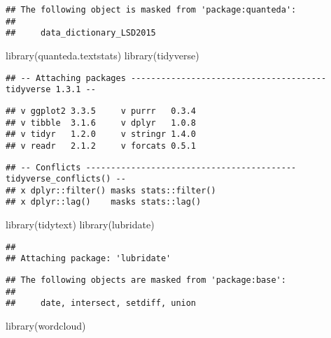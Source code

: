 \documentclass[
]{article}
\newenvironment{Shaded}{\begin{snugshade}}{\end{snugshade}}
\newcommand{\FunctionTok}[1]{\textcolor[rgb]{0.00,0.00,0.00}{#1}}
\newcommand{\NormalTok}[1]{#1}
\begin{document}
\begin{verbatim}
## The following object is masked from 'package:quanteda':
## 
##     data_dictionary_LSD2015
\end{verbatim}

\begin{Shaded}
\begin{Highlighting}[]
\FunctionTok{library}\NormalTok{(quanteda.textstats)}
\FunctionTok{library}\NormalTok{(tidyverse)}
\end{Highlighting}
\end{Shaded}

\begin{verbatim}
## -- Attaching packages --------------------------------------- tidyverse 1.3.1 --
\end{verbatim}

\begin{verbatim}
## v ggplot2 3.3.5     v purrr   0.3.4
## v tibble  3.1.6     v dplyr   1.0.8
## v tidyr   1.2.0     v stringr 1.4.0
## v readr   2.1.2     v forcats 0.5.1
\end{verbatim}

\begin{verbatim}
## -- Conflicts ------------------------------------------ tidyverse_conflicts() --
## x dplyr::filter() masks stats::filter()
## x dplyr::lag()    masks stats::lag()
\end{verbatim}

\begin{Shaded}
\begin{Highlighting}[]
\FunctionTok{library}\NormalTok{(tidytext)}
\FunctionTok{library}\NormalTok{(lubridate)}
\end{Highlighting}
\end{Shaded}

\begin{verbatim}
## 
## Attaching package: 'lubridate'
\end{verbatim}

\begin{verbatim}
## The following objects are masked from 'package:base':
## 
##     date, intersect, setdiff, union
\end{verbatim}

\begin{Shaded}
\begin{Highlighting}[]
\FunctionTok{library}\NormalTok{(wordcloud)}
\end{Highlighting}
\end{Shaded}
\end{document}
